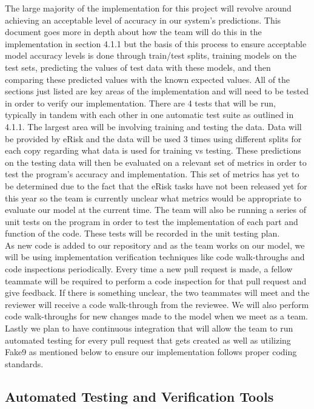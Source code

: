 \documentclass[12pt, titlepage]{article}
\begin{document}
  The large majority of the implementation for this project will revolve around achieving an acceptable level of accuracy in our system’s predictions. This document goes more in depth about how the team will do this in the implementation in section 4.1.1 but the basis of this process to ensure acceptable model accuracy levels is done through train/test splits, training models on the test sets, predicting the values of test data with these models, and then comparing these predicted values with the known expected values. All of the sections just listed are key areas of the implementation and will need to be tested in order to verify our implementation. There are 4 tests that will be run, typically in tandem with each other in one automatic test suite as outlined in 4.1.1. The largest area will be involving training and testing the data. Data will be provided by eRisk and the data will be used 3 times using different splits for each copy regarding what data is used for training vs testing. These predictions on the testing data will then be evaluated on a relevant set of metrics in order to test the program's accuracy and implementation. This set of metrics has yet to be determined due to the fact that the eRisk tasks have not been released yet for this year so the team is currently unclear what metrics would be appropriate to evaluate our model at the current time. The team will also be running a series of unit tests on the program in order to test the implementation of each part and function of the code. These tests will be recorded in the unit testing plan.\\
    
  As new code is added to our repository and as the team works on our model, we will be using implementation verification techniques like code walk-throughs and code inspections periodically. Every time a new pull request is made, a fellow teammate will be required to perform a code inspection for that pull request and give feedback. If there is something unclear, the two teammates will meet and the reviewer will receive a code walk-through from the reviewee. We will also perform code walk-throughs for new changes made to the model when we meet as a team. Lastly we plan to have continuous integration that will allow the team to run automated testing for every pull request that gets created as well as utilizing Fake9 as mentioned below to ensure our implementation follows proper coding standards.
  
  
  \subsection{Automated Testing and Verification Tools} \label{Automated Testing and Verification Tools}
\end{document}
